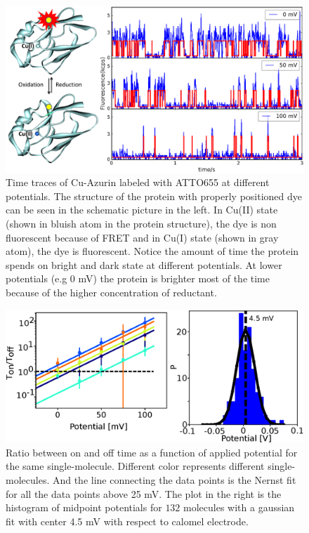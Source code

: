 \documentclass[journal=jacsat,manuscript=article]{achemso}
\begin{document}
\begin{figure}
	\includegraphics[width=\textwidth]{Figure/Figure_1_timetrace_CuAzu.eps}
	\caption{Time traces of Cu-Azurin labeled with ATTO655 at different potentials. The structure of the protein with properly positioned dye can be seen in the schematic picture in the left. In Cu(II) state (shown in bluish atom in the protein structure), the dye is non fluorescent because of FRET and in Cu(I) state (shown in gray atom), the dye is fluorescent. Notice the amount of time the protein spends on bright and dark state at different potentials. At lower potentials (e.g 0 mV) the protein is brighter most of the time because of the higher concentration of reductant.}
	\label{fig:timetrace}
\end{figure}
\begin{figure}
	\includegraphics[width=\textwidth]{Figure/Figure_2_midpoint.eps}
	\caption{Ratio between on and off time as a function of applied potential for the same single-molecule. Different color represents different single-molecules. And the line connecting the data points is the Nernst fit for all the data points above 25 mV. The plot in the right is the histogram of midpoint potentials for $132$ molecules with a gaussian fit with center 4.5 mV with respect to calomel electrode.}
	\label{fig:midpoint}
\end{figure}
\end{document}

